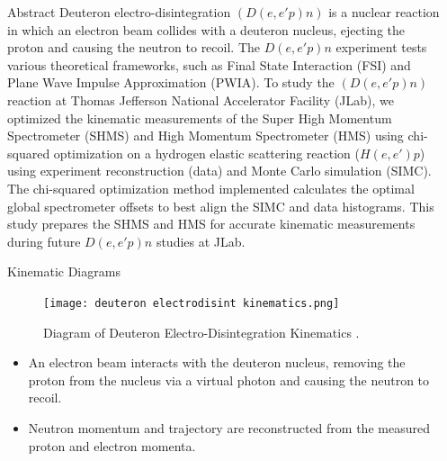 \documentclass[final]{beamer}
\newlength{\sepwidth}
\newlength{\colwidth}
\newcommand{\separatorcolumn}{\begin{column}{\sepwidth}\end{column}}
\begin{document}
\begin{frame}[t]
\begin{columns}[t]
\separatorcolumn

\begin{column}{\colwidth}
\vspace{-.5cm}
  \begin{exampleblock}{Abstract}
    Deuteron electro-disintegration $(D(e,e'p)n)$ is a nuclear reaction in which an electron beam collides with a deuteron nucleus, ejecting the proton and causing the neutron to recoil. The $D(e,e'p)n$ experiment tests various theoretical frameworks, such as Final State Interaction (FSI) and Plane Wave Impulse Approximation (PWIA). To study the $(D(e, e'p)n)$ reaction at Thomas Jefferson National Accelerator Facility (JLab), we optimized the kinematic measurements of the Super High Momentum Spectrometer (SHMS) and High Momentum Spectrometer (HMS) using chi-squared optimization on a hydrogen elastic scattering reaction ($H(e,e')p$) using experiment reconstruction (data) and Monte Carlo simulation (SIMC). The chi-squared optimization method implemented calculates the optimal global spectrometer offsets to best align the SIMC and data histograms. This study prepares the SHMS and HMS for accurate kinematic measurements during future $D(e,e'p)n$ studies at JLab.
    \end{exampleblock}
\vspace{-0.5cm}
  \begin{block}{Kinematic Diagrams}
  \vspace{0cm}
  \begin{figure}
      \centering
      \texttt{[image: deuteron electrodisint kinematics.png]}
      \vspace{-1cm}
      \caption{Diagram of Deuteron Electro-Disintegration Kinematics \cite{yero2020thesis}.}
      \label{fig:deuteron-kinematics}
   \end{figure}
\vspace{-1cm}
\begin{itemize}
   \item An electron beam interacts with the deuteron nucleus, removing the proton from the nucleus via a virtual photon and causing the neutron to recoil.
   \item Neutron momentum and trajectory are reconstructed from the measured proton and electron momenta.
\end{itemize}
      \vspace{-.75cm}
  \begin{figure}
      \begin{tikzpicture}[>=latex,scale=1.45]

\end{tikzpicture}
\end{figure}
\end{block}
\end{column}
\end{columns}
\end{frame}
\end{document}
